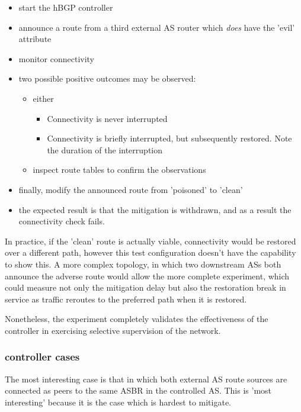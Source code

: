 \begin{itemize}
    \item start the hBGP controller
    \item announce a route from a third external AS router which \textit{does} have the 'evil' attribute
    \item monitor connectivity
    \item two possible positive outcomes may be observed:
    \begin{itemize}

    \item either
    \begin{itemize}
    \item Connectivity is never interrupted
    \item Connectivity is briefly interrupted, but subsequently restored. Note the duration of the interruption
    \end{itemize}

    \item inspect route tables to confirm the observations
    \end{itemize}

    \item finally, modify the announced route from 'poisoned' to 'clean'
    \item the expected result is that the mitigation is withdrawn, and as a result the connectivity check fails.
\end{itemize}

In practice, if the 'clean' route is actually viable, connectivity would be restored over a different path, however this test configuration doesn't have the capability to show this. A more complex topology, in which two downstream ASs both announce the adverse route would allow the more complete experiment, which could measure not only the mitigation delay but also the restoration break in service as traffic reroutes to the preferred path when it is restored.

Nonetheless, the experiment completely validates the effectiveness of the controller in exercising selective supervision of the network.

\subsubsection{controller cases}
The most interesting case is that in which both external AS route sources are connected as peers to the same ASBR in the controlled AS. This is 'most interesting' because it is the case which is hardest to mitigate.

